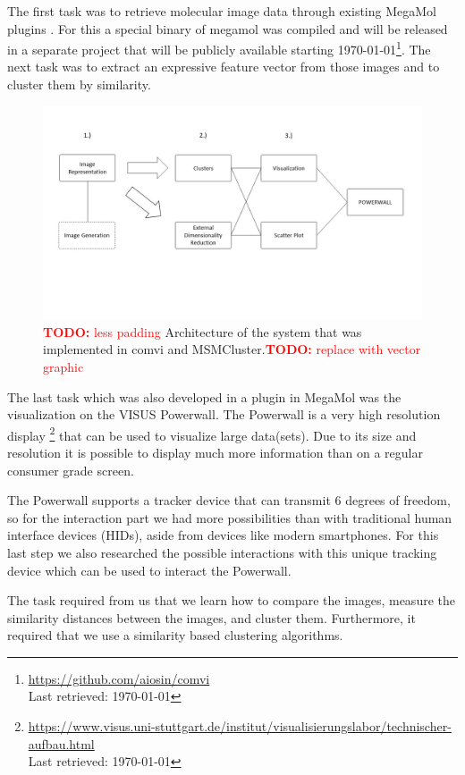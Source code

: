 \documentclass[journal]{vgtc}       %
\newcommand{\todo}[1]{\textcolor{red}{\textbf{TODO:} #1}}
\begin{document}
The first task was to retrieve molecular image data through existing MegaMol plugins \cite{molecularmaps}. For this a special binary of megamol was compiled and will be released in a separate project that will be publicly available starting \today \footnote{\url{https://github.com/aiosin/comvi}\\ Last retrieved: \today}.
The next task was to extract an expressive feature vector from those images and to cluster them by similarity.
\begin{figure}[htbp]
	\begin{center}
		\includegraphics[width=.75\linewidth]{Folie1}
	\end{center}
	\caption{\label{fig:arch} \todo{less padding} Architecture of the system that was implemented in comvi and MSMCluster.\todo{replace with vector graphic}}
\end{figure} 
The last task which was also developed in a plugin in MegaMol was the visualization on the VISUS Powerwall. The Powerwall is a very high resolution display \footnote{\url{https://www.visus.uni-stuttgart.de/institut/visualisierungslabor/technischer-aufbau.html} \\ Last retrieved: \today } that can be used to visualize large data(sets). Due to its size and resolution it is possible to display much more information than on a regular consumer grade screen. 

The Powerwall supports a tracker device that can transmit 6 degrees of freedom, so for the interaction part we had more possibilities than with traditional human interface  devices  (HIDs), aside from devices like modern smartphones. For this last step we also researched the possible interactions with this unique tracking device  which can be used to interact the Powerwall.

The task required from us that we learn how to compare the images, measure the similarity  distances between the images, and cluster them. Furthermore, it  required that we use a similarity based clustering algorithms.
\end{document}
